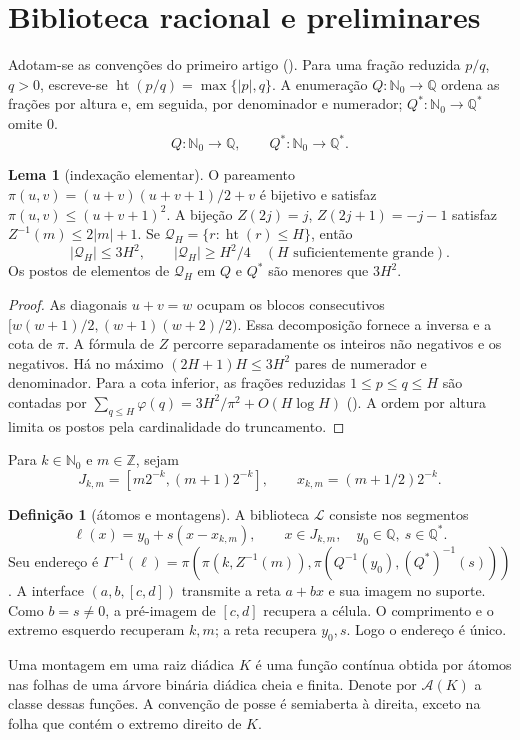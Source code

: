 \documentclass[12pt,a4paper]{article}
\makeatletter
\theoremstyle{preciso}
\theoremstyle{definition}
\newcommand{\Nzero}{\mathbb{N}_0}
\newcommand{\Qstar}{\mathbb{Q}^{\!*}}
\newcommand{\Aclass}{\mathcal{A}}
\newcommand{\Library}{\mathcal{L}}
\newcommand{\height}{\operatorname{ht}}
\theoremstyle{preciso}
\theoremstyle{preciso}
\newtheorem{lemma}[teorema]{Lema}
\theoremstyle{preciso}
\theoremstyle{preciso}
\theoremstyle{definition}
\newtheorem{definition}[teorema]{Definição}
\theoremstyle{preciso}
\theoremstyle{definition}
\theoremstyle{preciso}
\theoremstyle{preciso}
\theoremstyle{definition}
\newcommand{\abntlookup}[2]{\ifcsname ab#1@#2\endcsname\csname ab#1@#2\endcsname\else\textbf{??}\PackageWarning{abnt}{Citacao indefinida: #2}\fi}
\newcommand{\abntpar}[1]{\hyperlink{bib:#1}{\abntlookup{U}{#1}, \abntlookup{Y}{#1}}}
\newcommand{\abntsep}{}
\newcommand{\abntpitem}[1]{\abntsep\renewcommand{\abntsep}{; }\abntpar{#1}}
\newcommand{\citep}[2][]{\begingroup\renewcommand{\abntsep}{}(\forcsvlist{\abntpitem}{#2}\ifblank{#1}{}{, #1})\endgroup}
\makeatother
\begin{document}
\section{Biblioteca racional e preliminares}
\label{artigo_2:sec:indexing}\label{artigo_2:sec:generator}\label{artigo_2:sec:assemblies}
Adotam-se as convenções do primeiro artigo \citep{artigo_2-oliveiraI}. Para uma fração reduzida $p/q$, $q>0$, escreve-se $\height(p/q)=\max\{|p|,q\}$. A enumeração $Q:\Nzero\to\mathbb Q$ ordena as frações por altura e, em seguida, por denominador e numerador; $Q^*:\Nzero\to\Qstar$ omite $0$.
\begin{equation}
 Q:\Nzero\longrightarrow\mathbb Q,\qquad Q^*:\Nzero\longrightarrow\Qstar.
 \label{artigo_2:eq:q-enums}
\end{equation}
\begin{lemma}[indexação elementar]\label{map:artigo_2:2.1}
\label{artigo_2:lem:cantor}\label{artigo_2:lem:integers}\label{artigo_2:lem:rational-count}\label{artigo_2:lem:rational-rank}
O pareamento $\pi(u,v)=(u+v)(u+v+1)/2+v$ é bijetivo e satisfaz $\pi(u,v)\le(u+v+1)^2$. A bijeção $Z(2j)=j$, $Z(2j+1)=-j-1$ satisfaz $Z^{-1}(m)\le2|m|+1$. Se $\mathcal Q_H=\{r:\height(r)\le H\}$, então
\[
 |\mathcal Q_H|\le3H^2,\qquad |\mathcal Q_H|\ge H^2/4\quad(H\text{ suficientemente grande}).
\]
Os postos de elementos de $\mathcal Q_H$ em $Q$ e $Q^*$ são menores que $3H^2$.
\end{lemma}
\begin{proof}
As diagonais $u+v=w$ ocupam os blocos consecutivos $[w(w+1)/2,(w+1)(w+2)/2)$. Essa decomposição fornece a inversa e a cota de $\pi$. A fórmula de $Z$ percorre separadamente os inteiros não negativos e os negativos. Há no máximo $(2H+1)H\le3H^2$ pares de numerador e denominador. Para a cota inferior, as frações reduzidas $1\le p\le q\le H$ são contadas por $\sum_{q\le H}\varphi(q)=3H^2/\pi^2+O(H\log H)$ \citep{artigo_1-hardy2008}. A ordem por altura limita os postos pela cardinalidade do truncamento.
\end{proof}

Para $k\in\Nzero$ e $m\in\mathbb Z$, sejam
\[
 J_{k,m}=[m2^{-k},(m+1)2^{-k}],\qquad x_{k,m}=(m+1/2)2^{-k}.
\]
\begin{definition}[átomos e montagens]\label{map:artigo_2:2.2}\label{artigo_2:def:assembly}\label{artigo_2:thm:dictionary}\label{artigo_2:lem:cell-recovery}
A biblioteca $\Library$ consiste nos segmentos
\[
 \ell(x)=y_0+s(x-x_{k,m}),\qquad x\in J_{k,m},\quad y_0\in\mathbb Q,\ s\in\Qstar.
\]
Seu endereço é $\Gamma^{-1}(\ell)=\pi(\pi(k,Z^{-1}(m)),\pi(Q^{-1}(y_0),(Q^*)^{-1}(s)))$. A interface $(a,b,[c,d])$ transmite a reta $a+bx$ e sua imagem no suporte. Como $b=s\ne0$, a pré-imagem de $[c,d]$ recupera a célula. O comprimento e o extremo esquerdo recuperam $k,m$; a reta recupera $y_0,s$. Logo o endereço é único.

Uma montagem em uma raiz diádica $K$ é uma função contínua obtida por átomos nas folhas de uma árvore binária diádica cheia e finita. Denote por $\Aclass(K)$ a classe dessas funções. A convenção de posse é semiaberta à direita, exceto na folha que contém o extremo direito de $K$.
\end{definition}
\end{document}
